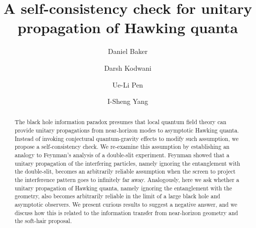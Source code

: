 \documentclass[aps,showpacs,twocolumn,floats,prd,superscriptaddress,nofootinbib]{revtex4-1}
\begin{document}
\title{A self-consistency check for unitary propagation of Hawking quanta}

\author{Daniel Baker}

\author{Darsh Kodwani}

\author{Ue-Li Pen}

\author{I-Sheng Yang}


\begin{abstract}
The black hole information paradox presumes that local quantum field theory can provide unitary propagations from near-horizon modes to asymptotic Hawking quanta. 
Instead of invoking conjectural quantum-gravity effects to modify such assumption, we propose a self-consistency check.
We re-examine this assumption by establishing an analogy to Feynman's analysis of a double-slit experiment. 
Feynman showed that a unitary propagation of the interfering particles, namely ignoring the entanglement with the double-slit, becomes an arbitrarily reliable assumption when the screen to project the interference pattern goes to infinitely far away.
Analogously, here we ask whether a unitary propagation of Hawking quanta, namely ignoring the entanglement with the geometry, also becomes arbitrarily reliable in the limit of a large black hole and asymptotic observers. 
We present curious results to suggest a negative answer, and we discuss how this is related to the information transfer from near-horizon geometry and the soft-hair proposal.
\end{abstract}
\end{document}
